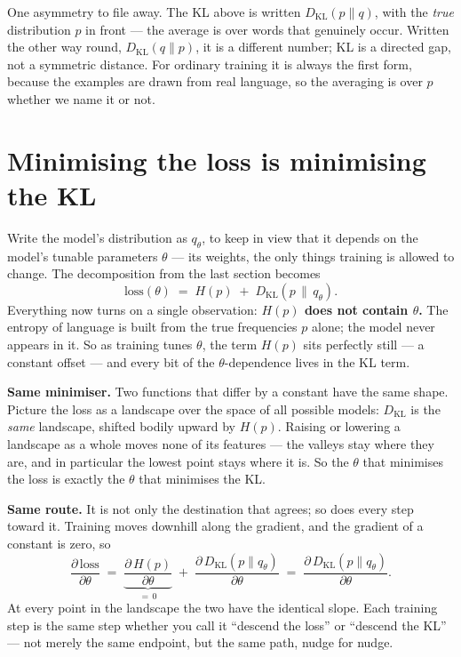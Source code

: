 \documentclass[11pt]{article}
\begin{document}
\begin{insight}
One asymmetry to file away. The KL above is written $D_{\mathrm{KL}}(p\|q)$, with the \emph{true}
distribution $p$ in front --- the average is over words that genuinely occur. Written the other
way round, $D_{\mathrm{KL}}(q\|p)$, it is a different number; KL is a directed gap, not a
symmetric distance. For ordinary training it is always the first form, because the examples are
drawn from real language, so the averaging is over $p$ whether we name it or not.
\end{insight}

\section{Minimising the loss is minimising the KL}

Write the model's distribution as $q_\theta$, to keep in view that it depends on the model's
tunable parameters $\theta$ --- its weights, the only things training is allowed to change. The
decomposition from the last section becomes
\[
  \text{loss}(\theta) \;=\; H(p) \;+\; D_{\mathrm{KL}}(p \,\|\, q_\theta).
\]
Everything now turns on a single observation: \textbf{$H(p)$ does not contain $\theta$.} The
entropy of language is built from the true frequencies $p$ alone; the model never appears in it.
So as training tunes $\theta$, the term $H(p)$ sits perfectly still --- a constant offset --- and
every bit of the $\theta$-dependence lives in the KL term.

\textbf{Same minimiser.} Two functions that differ by a constant have the same shape. Picture the
loss as a landscape over the space of all possible models: $D_{\mathrm{KL}}$ is the \emph{same}
landscape, shifted bodily upward by $H(p)$. Raising or lowering a landscape as a whole moves none
of its features --- the valleys stay where they are, and in particular the lowest point stays
where it is. So the $\theta$ that minimises the loss is exactly the $\theta$ that minimises the
KL.

\textbf{Same route.} It is not only the destination that agrees; so does every step toward it.
Training moves downhill along the gradient, and the gradient of a constant is zero, so
\[
  \frac{\partial\,\text{loss}}{\partial \theta}
    \;=\; \underbrace{\frac{\partial\, H(p)}{\partial\theta}}_{=\,0}
      \;+\; \frac{\partial\, D_{\mathrm{KL}}(p\|q_\theta)}{\partial\theta}
    \;=\; \frac{\partial\, D_{\mathrm{KL}}(p\|q_\theta)}{\partial\theta}.
\]
At every point in the landscape the two have the identical slope. Each training step is the same
step whether you call it ``descend the loss'' or ``descend the KL'' --- not merely the same
endpoint, but the same path, nudge for nudge.
\end{document}
